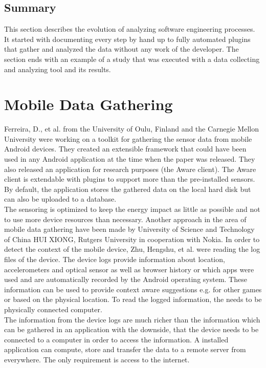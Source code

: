\subsection{Summary}
This section describes the evolution of analyzing software engineering processes. It started with documenting every step by hand up to fully automated plugins that gather and analyzed the data without any work of the developer.
The section ends with an example of a study that was executed with a data collecting and analyzing tool and its results. 


\section{Mobile Data Gathering}
Ferreira, D., et al. \cite{ferreira2015aware} from the University of Oulu, Finland and the Carnegie Mellon University were working on a toolkit for gathering the sensor data from mobile Android devices. They created an extensible framework that could have been used in any Android application at the time when the paper was released. They also released an application for research purposes (the Aware client). The Aware client is extendable with plugins to support more than the pre-installed sensors. By default, the application stores the gathered data on the local hard disk but can also be uploaded to a database.\\
The sensoring is optimized to keep the energy impact as little as possible and not to use more device resources than necessary.
\bigbreak
Another approach in the area of mobile data gathering have been made by University of Science and Technology of China HUI XIONG, Rutgers University in cooperation with Nokia. In order to detect the context of the mobile device, Zhu, Hengshu, et al. \cite{zhu2015mining} were reading the log files of the device. The device logs provide information about location, accelerometers and optical sensor as well as browser history or which apps were used and are automatically recorded by the Android operating system. These information can be used to provide context aware suggestions e.g. for other games or based on the physical location. To read the logged information, the needs to be physically connected computer.\\
The information from the device logs are much richer than the information which can be gathered in an application with the downside, that the device needs to be connected to a computer in order to access the information. A installed application can compute, store and transfer the data  to a remote server from everywhere. The only requirement is access to the internet.

